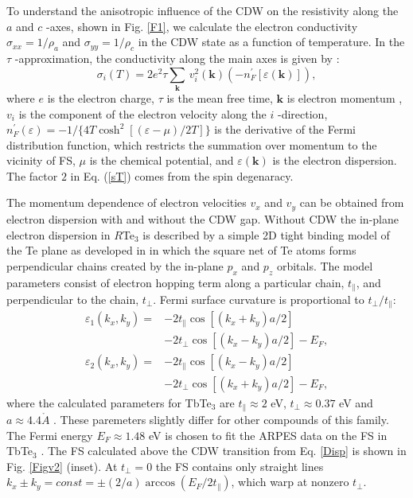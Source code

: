 To understand the anisotropic influence of the CDW on the
resistivity along the $a$ and $c$ -axes, shown in Fig. \ref{F1}, we
calculate the electron conductivity $\sigma _{xx}=1/\rho _{a}$ and
$\sigma _{yy}=1/\rho _{c}$ in the CDW state as a function of
temperature. In the $\tau $ -approximation, the conductivity along
the main axes is given by \cite{Abrik}:
\begin{equation}
\sigma _{i}\left( T\right) =2e^{2}\tau \sum_{\boldsymbol{k}
}\,v_{i}^{2}\left( \boldsymbol{k}\right) \left( -n_{F}^{\prime
}\left[ \varepsilon \left( \boldsymbol{k}\right) \right] \right) ,
\label{sT}
\end{equation}
where $e$ is the electron charge, $\tau $ is the mean free time, $
\boldsymbol{k}$ is electron momentum \cite{CommentKz}, $v_{i}$ is
the component of the electron velocity along the $i$ -direction,
$n_{F}^{\prime }(\varepsilon )=-1/\{4T\cosh ^{2}\left[ (\varepsilon
-\mu )/2T\right] \}$ is the derivative of the Fermi distribution
function, which restricts the summation over momentum to the
vicinity of FS, $\mu $ is the chemical potential, and $\varepsilon
\left( \boldsymbol{k}\right) $ is the electron dispersion. The
factor $2$ in Eq. (\ref{sT}) comes from the spin degenaracy.

The momentum dependence of electron velocities $v_{x}$ and $v_{y}$
can be obtained from electron dispersion with and without the CDW
gap. Without CDW the in-plane electron dispersion in $R$Te$_{3}$ is
described by a simple 2D tight binding model of the Te plane as
developed in \cite{Brouet08} in which the square net of Te atoms
forms perpendicular chains created by the in-plane $p_x$ and $p_z$
orbitals. The model parameters consist of electron hopping term
along a particular chain, $t_{\parallel}$, and perpendicular to the
chain, $t_{\perp}$. Fermi surface curvature is proportional to
$t_{\perp}/t_{\parallel}$:
\begin{equation}
\begin{split}
\varepsilon _{1}\left( k_{x},k_{y}\right) =& -2t_{\parallel }\cos
\left[
\left( k_{x}+k_{y}\right) a/2\right] \\
& -2t_{\perp }\cos \left[ \left( k_{x}-k_{y}\right) a/2\right] -E_{F}, \\
\varepsilon _{2}\left( k_{x},k_{y}\right) =& -2t_{\parallel }\cos
\left[
\left( k_{x}-k_{y}\right) a/2\right] \\
& -2t_{\perp }\cos \left[ \left( k_{x}+k_{y}\right) a/2\right]
-E_{F},
\end{split}
\label{Disp}
\end{equation}
where the calculated parameters for TbTe$_{3}$ are $t_{\parallel
}\approx 2$ eV, $t_{\perp }\approx 0.37$ eV and $a\approx
4.4\mathring{A}$ \cite{Brouet08,Kikuchi}. These paremeters slightly
differ for other compounds of this family. The Fermi energy
$E_{F}\approx 1.48$ eV is chosen to fit the ARPES data on the FS in
TbTe$_{3}$ \cite{Brouet08,NJP}. The FS calculated above the CDW
transition from Eq. \ref {Disp} is shown in Fig. \ref{Figv2}
(inset). At $t_{\perp }=0$ the FS contains only straight lines
$k_{x}\pm k_{y}=const=\pm \left( 2/a\right) \arccos \left(
E_{F}/2t_{\parallel }\right) $, which warp at nonzero $t_{\perp }$.

